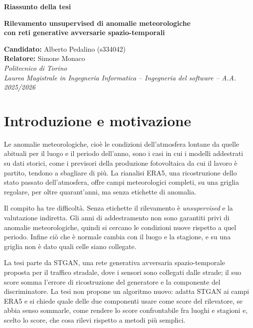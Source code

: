 \documentclass[11pt,a4paper]{article}
\begin{document}
\begin{center}
{\LARGE\bfseries Riassunto della tesi\par}
\vspace{0.4em}
{\Large\bfseries Rilevamento unsupervised di anomalie meteorologiche\\con reti generative avversarie spazio-temporali\par}
\vspace{1.2em}
\textbf{Candidato:} Alberto Pedalino (s334042)\\
\textbf{Relatore:} Simone Monaco\\
\emph{Politecnico di Torino}\\
\emph{Laurea Magistrale in Ingegneria Informatica -- Ingegneria del software -- A.A. 2025/2026}
\end{center}

\section{Introduzione e motivazione}

Le anomalie meteorologiche, cioè le condizioni dell'atmosfera lontane da quelle abituali per il luogo e il periodo dell'anno, sono i casi in cui i modelli addestrati su dati storici, come i previsori della produzione fotovoltaica da cui il lavoro è partito, tendono a sbagliare di più. La rianalisi ERA5, una ricostruzione dello stato passato dell'atmosfera, offre campi meteorologici completi, su una griglia regolare, per oltre quarant'anni, ma senza etichette di anomalia.

Il compito ha tre difficoltà. Senza etichette il rilevamento è \emph{unsupervised} e la valutazione indiretta. Gli anni di addestramento non sono garantiti privi di anomalie meteorologiche, quindi si cercano le condizioni nuove rispetto a quel periodo. Infine ciò che è normale cambia con il luogo e la stagione, e su una griglia non è dato quali celle siano collegate.

La tesi parte da STGAN, una rete generativa avversaria spazio-temporale proposta per il traffico stradale, dove i sensori sono collegati dalle strade; il suo score somma l'errore di ricostruzione del generatore e la componente del discriminatore. La tesi non propone un algoritmo nuovo: adatta STGAN ai campi ERA5 e si chiede quale delle due componenti usare come score del rilevatore, se abbia senso sommarle, come rendere lo score confrontabile fra luoghi e stagioni e, scelto lo score, che cosa rilevi rispetto a metodi più semplici.
\end{document}
